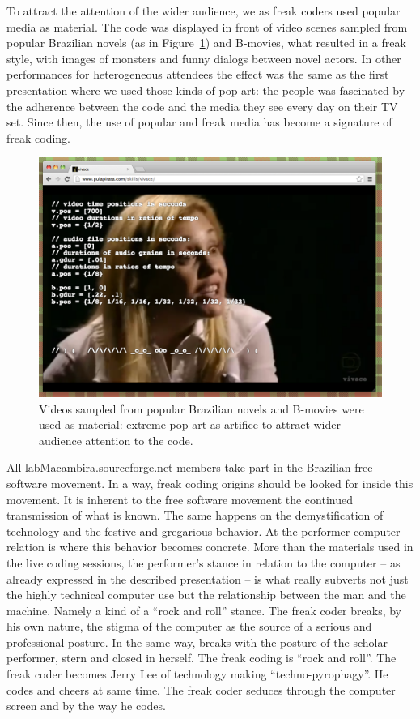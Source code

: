 \documentclass[letterpaper, 12pt]{article}
\begin{document}
{To attract the attention of the wider audience, we as freak coders
used popular media as material. The code was displayed in front of
video scenes sampled from popular Brazilian novels (as in
Figure~\ref{fig:novela}) and B-movies, what resulted in a freak style,
with images of monsters and funny dialogs between novel actors. In
other performances for heterogeneous attendees the effect was the same
as the first presentation where we used those kinds of pop-art: the
people was fascinated by the adherence between the code and the media
they see every day on their TV set. Since then, the use of popular and
freak media has become a signature of freak coding.

\begin{figure}[htpb]
  \begin{center}
    \includegraphics[scale=.3]{img/fig_novela.png}
    \caption{Videos sampled from popular Brazilian novels and B-movies
      were used as material: extreme pop-art as artifice to attract
      wider audience attention to the code.}
    \label{fig:novela}
  \end{center}
\end{figure}

All labMacambira.sourceforge.net members take part in the Brazilian
free software movement. In a way, freak coding origins should be
looked for inside this movement. It is inherent to the free software
movement the continued transmission of what is known. The same happens
on the demystification of technology and the festive and gregarious
behavior. At the performer-computer relation is where this behavior
becomes concrete. More than the materials used in the live coding
sessions, the performer's stance in relation to the computer -- as
already expressed in the described presentation -- is what really
subverts not just the highly technical computer use but the
relationship between the man and the machine. Namely a kind of a
``rock and roll'' stance. The freak coder breaks, by his own nature,
the stigma of the computer as the source of a serious and professional
posture. In the same way, breaks with the posture of the scholar
performer, stern and closed in herself. The freak coding is ``rock and
roll''. The freak coder becomes Jerry Lee of technology making
``techno-pyrophagy''. He codes and cheers at same time. The freak
coder seduces through the computer screen and by the way he codes.

}
\end{document}
